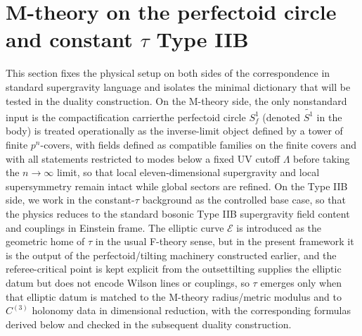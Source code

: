 \documentclass[11pt]{article}
\theoremstyle{remark}
\newcommand{\calE}{\mathcal{E}}
\newcommand{\tS}{\widetilde{S^{1}}}
\begin{document}
\section{M-theory on the perfectoid circle and constant \texorpdfstring{\(\tau\)}{tau} Type IIB
}
\label{sec:phys-setup}


This section fixes the physical setup on both sides of the correspondence in standard supergravity language and isolates the minimal dictionary that will be tested in the duality construction. On the M-theory side, the only nonstandard input is the compactification carrier\:the perfectoid circle \(S_f^1\) (denoted \(\tS\) in the body) is treated operationally as the inverse-limit object defined by a tower of finite \(p^{n}\)-covers, with fields defined as compatible families on the finite covers and with all statements restricted to modes below a fixed UV cutoff \(\Lambda\) before taking the \(n\to\infty\) limit, so that local eleven-dimensional supergravity and local supersymmetry remain intact while global sectors are refined. On the Type IIB side, we work in the constant-\(\tau\) background as the controlled base case, so that the physics reduces to the standard bosonic Type IIB supergravity field content and couplings in Einstein frame. The elliptic curve \(\calE\) is introduced as the geometric home of \(\tau\) in the usual F-theory sense, but in the present framework it is the output of the perfectoid/tilting machinery constructed earlier, and the referee-critical point is kept explicit from the outset\:tilting supplies the elliptic datum but does not encode Wilson lines or couplings, so \(\tau\) emerges only when that elliptic datum is matched to the M-theory radius/metric modulus and to \(C^{(3)}\) holonomy data in dimensional reduction, with the corresponding formulas derived below and checked in the subsequent duality construction.
\end{document}
